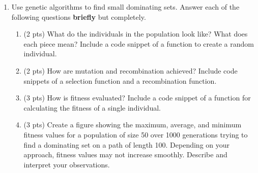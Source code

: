 \documentclass{article}
\begin{document}
\begin{enumerate}
    \item Use genetic algorithms to find small dominating sets. Answer each of the following questions \textbf{briefly} but completely.
    \begin{enumerate}
        \item (2 pts) What do the individuals in the population look like? What does each piece mean? Include a code snippet of a function to create a random individual.
        \item (2 pts) How are mutation and recombination achieved? Include code snippets of a selection function and a recombination function.
        \item (3 pts) How is fitness evaluated? Include a code snippet of a function for calculating the fitness of a single individual.
        \item (3 pts) Create a figure showing the maximum, average, and minimum fitness values for a population of size 50 over 1000 generations trying to find a dominating set on a path of length 100. Depending on your approach, fitness values may not increase smoothly. Describe and interpret your observations.
    \end{enumerate}
        

    
\end{enumerate}
\end{document}
